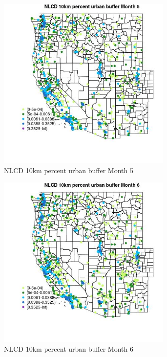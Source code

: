 \begin{figure} 
\centering  
\includegraphics[width=0.77\textwidth]{Code_Outputs/Report_ML_input_PM25_Step4_part_f_de_duplicated_aveswNAs_MapObsMo5NLCD_10km_percent_urban_buffer.jpg} 
\caption{\label{fig:Report_ML_input_PM25_Step4_part_f_de_duplicated_aveswNAsMapObsMo5NLCD_10km_percent_urban_buffer}NLCD 10km percent urban buffer Month 5} 
\end{figure} 
 

\begin{figure} 
\centering  
\includegraphics[width=0.77\textwidth]{Code_Outputs/Report_ML_input_PM25_Step4_part_f_de_duplicated_aveswNAs_MapObsMo6NLCD_10km_percent_urban_buffer.jpg} 
\caption{\label{fig:Report_ML_input_PM25_Step4_part_f_de_duplicated_aveswNAsMapObsMo6NLCD_10km_percent_urban_buffer}NLCD 10km percent urban buffer Month 6} 
\end{figure} 
 

